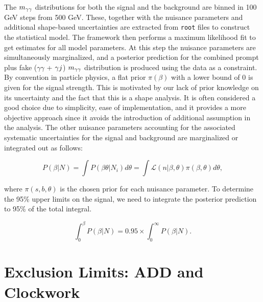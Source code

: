 The $m_{\gamma\gamma}$ distributions for both the signal and the background are binned in 100 GeV steps from 500 GeV. These, together with the nuisance parameters and additional shape-based uncertainties are extracted from \texttt{root} files to construct the statistical model. The framework then performs a maximum likelihood fit to get estimates for all model parameters. At this step the nuisance parameters are simultaneously marginalized, and a posterior prediction for the combined prompt plus fake ($\gamma\gamma$ + $\gamma j$) $m_{\gamma\gamma}$ distribution is produced using the data as a constraint. By convention in particle physics, a flat prior $\pi(\beta)$ with a lower bound of 0 is given for the signal strength. This is motivated by our lack of prior knowledge on its uncertainty and the fact that this is a shape analysis. It is often considered a good choice due to simplicity, ease of implementation, and it provides a more objective approach since it avoids the introduction of additional assumption in the analysis. The other nuisance parameters accounting for the associated systematic uncertainties for the signal and background are marginalized or integrated out as follows:


\begin{equation}
    P(\beta |N) = \int P(\beta \theta |N_i) d\theta = \int \mathcal{L}(n| \beta, \theta) \pi(\beta,\theta) d\theta, 
\end{equation}

where  $\pi(s,b, \theta)$ is the chosen prior for each nuisance parameter. To determine the 95\% upper limits on the signal, we need to integrate the posterior prediction to 95\% of the total integral.

\begin{equation}\label{95CL}
   \int^{\beta}_0 P(\beta |N)  = 0.95\times\int^{\infty}_0 P(\beta |N). 
\end{equation}

\section{Exclusion Limits: ADD and Clockwork}~\label{sec:ADDCWresults}


